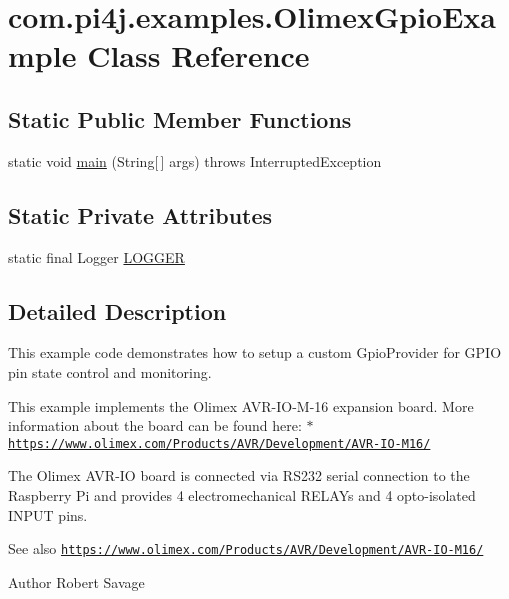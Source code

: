 \hypertarget{classcom_1_1pi4j_1_1examples_1_1OlimexGpioExample}{}\section{com.\+pi4j.\+examples.\+Olimex\+Gpio\+Example Class Reference}
\label{classcom_1_1pi4j_1_1examples_1_1OlimexGpioExample}
\subsection*{Static Public Member Functions}
\begin{DoxyCompactItemize}
\item 
static void \hyperlink{classcom_1_1pi4j_1_1examples_1_1OlimexGpioExample_a4ce4f2421e56f10045cd3e4bf88ba3e4}{main} (String\mbox{[}$\,$\mbox{]} args)  throws Interrupted\+Exception 
\end{DoxyCompactItemize}
\subsection*{Static Private Attributes}
\begin{DoxyCompactItemize}
\item 
static final Logger \hyperlink{classcom_1_1pi4j_1_1examples_1_1OlimexGpioExample_a66169162fd03d82589029339871fc778}{L\+O\+G\+G\+E\+R}
\end{DoxyCompactItemize}


\subsection{Detailed Description}
This example code demonstrates how to setup a custom Gpio\+Provider for G\+P\+I\+O pin state control and monitoring. 

This example implements the Olimex A\+V\+R-\/\+I\+O-\/\+M-\/16 expansion board. More information about the board can be found here\+: $\ast$ \href{https://www.olimex.com/Products/AVR/Development/AVR-IO-M16/}{\tt https\+://www.\+olimex.\+com/\+Products/\+A\+V\+R/\+Development/\+A\+V\+R-\/\+I\+O-\/\+M16/} 

The Olimex A\+V\+R-\/\+I\+O board is connected via R\+S232 serial connection to the Raspberry Pi and provides 4 electromechanical R\+E\+L\+A\+Ys and 4 opto-\/isolated I\+N\+P\+U\+T pins. 

\begin{DoxySeeAlso}{See also}
\href{https://www.olimex.com/Products/AVR/Development/AVR-IO-M16/}{\tt https\+://www.\+olimex.\+com/\+Products/\+A\+V\+R/\+Development/\+A\+V\+R-\/\+I\+O-\/\+M16/} 
\end{DoxySeeAlso}
\begin{DoxyAuthor}{Author}
Robert Savage 
\end{DoxyAuthor}


